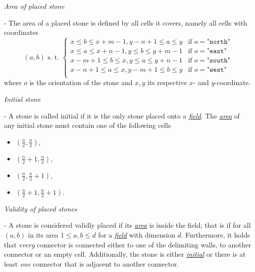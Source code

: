 \documentclass{scrartcl}
\begin{document}
\begin{mdframed}
  \hypertarget{area}{\emph{Area of placed stone}} - The area of a placed stone 
  is defined by all cells it covers, namely all cells with coordinates 
  \begin{equation*}
    (a, b) \text{ s. t. }
    \begin{cases}
      x\leq b\leq x + m - 1, y - n + 1\leq a\leq y &\text{if }o = \texttt{"north"}\\
      x\leq a\leq x + n - 1, y\leq b\leq y + m - 1 &\text{if }o = \texttt{"east"}\\
      x - m + 1\leq b\leq x, y\leq a\leq y + n - 1 &\text{if }o = \texttt{"south"}\\
      x - n + 1\leq a\leq x, y - m + 1\leq b\leq y &\text{if }o = \texttt{"west"}\\
    \end{cases}
  \end{equation*}
  where $o$ is the orientation of the stone and $x, y$ its respective $x$- and
  $y$-coordinate.
\end{mdframed}
\begin{mdframed}
  \hypertarget{initial}{\emph{Initial stone}} - A stone is called initial if it 
  is the only stone placed onto a \hyperlink{field}{\emph{field}}. The 
  \hyperlink{area}{\emph{area}} of any initial stone must contain one of the 
  following cells
  \begin{itemize}
    \item $(\frac{n}{2}, \frac{n}{2})$,
    \item $(\frac{n}{2} + 1, \frac{n}{2})$,
    \item $(\frac{n}{2}, \frac{n}{2} + 1)$,
    \item $(\frac{n}{2} + 1, \frac{n}{2} + 1)$.
  \end{itemize}
\end{mdframed}
\begin{mdframed}
  \hypertarget{valid}{\emph{Validity of placed stones}} - A stone is considered 
  validly placed if its \hyperlink{area}{\emph{area}} is inside the field; that 
  is if for all $(a, b)$ in its area $1\leq a, b\leq d$ for a 
  \hyperlink{field}{\emph{field}} with dimension $d$. Furthermore, it holds 
  that \emph{every} connector is connected either to one of the delimiting 
  walls, to another connector or an empty cell. Additionally, the stone is 
  either \hyperlink{initial}{\emph{initial}} or there is at least \emph{one} 
  connector that is adjacent to another connector.
\end{mdframed}
\end{document}
